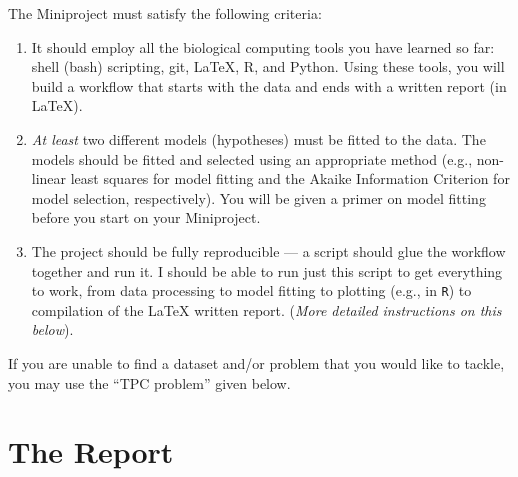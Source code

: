 The Miniproject must satisfy the following criteria:  
\begin{enumerate}
	
	\item It should employ all the biological computing tools you 
	have learned so far: shell (bash) scripting, git, \LaTeX, R, and 
	Python. Using these tools, you will build a workflow that starts with 
	the data and ends with a written report (in \LaTeX).
	
	\item {\it At least} two different models (hypotheses) must be fitted 
	to the data. The models should be fitted and selected using an 
	appropriate method (e.g., non-linear least squares for model fitting and 
	the Akaike Information Criterion for model selection, respectively). 
	You will be given a primer on model fitting before you start on your 
	Miniproject. 
	
	\item The project should be fully reproducible --- a script should 
	glue the workflow together and run it. I should be able to run just 
	this script to get everything to work, from data processing to model 
	fitting to plotting (e.g., in {\tt R}) to compilation of the \LaTeX 
	written report. ({\it More detailed instructions on this below}). 
	   
\end{enumerate}

If you are unable to find a dataset and/or problem that you would like 
to tackle, you may use the ``TPC problem'' given below.

\section{The Report}

